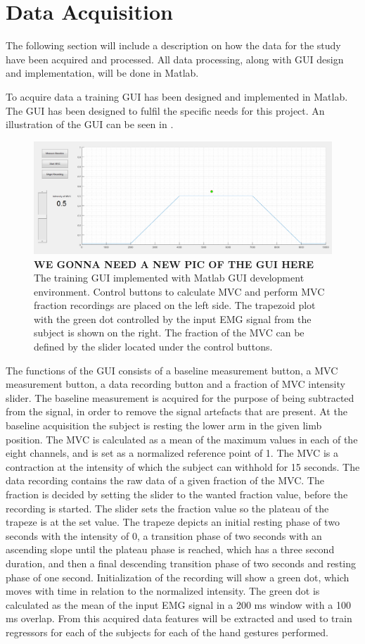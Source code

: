 \section{Data Acquisition}

The following section will include a description on how the data for the study have been acquired and processed. All data processing, along with GUI design and implementation, will be done in Matlab.

To acquire data a training GUI has been designed and implemented in Matlab. The GUI has been designed to fulfil the specific needs for this project. An illustration of the GUI can be seen in . 

\begin{figure}[H]
	\includegraphics[width=.4\textwidth]{figures/GUI/GUI_Training.png}
	\caption{\textbf{WE GONNA NEED A NEW PIC OF THE GUI HERE} The training GUI implemented with Matlab GUI development environment. Control buttons to calculate MVC and perform MVC fraction recordings are placed on the left side. The trapezoid plot with the green dot controlled by the input EMG signal from the subject is shown on the right. The fraction of the MVC can be defined by the slider located under the control buttons.}
	\label{fig:GUI_Training}
\end{figure} 

The functions of the GUI consists of a baseline measurement button, a MVC measurement button, a data recording button and a fraction of MVC intensity slider. The baseline measurement is acquired for the purpose of being subtracted from the signal, in order to remove the signal artefacts that are present. At the baseline acquisition the subject is resting the lower arm in the given limb position. The MVC is calculated as a mean of the maximum values in each of the eight channels, and is set as a normalized reference point of 1. The MVC is a contraction at the intensity of which the subject can withhold for 15 seconds. The data recording contains the raw data of a given fraction of the MVC. The fraction is decided by setting the slider to the wanted fraction value, before the recording is started. The slider sets the fraction value so the plateau of the trapeze is at the set value. The trapeze depicts an initial resting phase of two seconds with the intensity of 0, a transition phase of two seconds with an ascending slope until the plateau phase is reached, which has a three second duration, and then a final descending transition phase of two seconds and resting phase of one second. Initialization of the recording will show a green dot, which moves with time in relation to the normalized intensity. The green dot is calculated as the mean of the input EMG signal in a 200 ms window with a 100 ms overlap. %
From this acquired data features will be extracted and used to train regressors for each of the subjects for each of the hand gestures performed.


